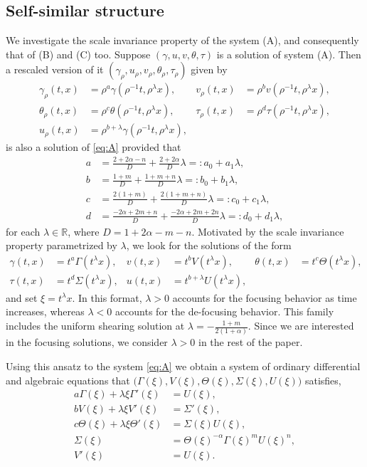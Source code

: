 \documentclass[graybox]{svmult}
\begin{document}
\subsection{Self-similar structure}
We investigate the scale invariance property of the system (A), and consequently that of (B) and (C) too.
Suppose $(\gamma,u,v,\theta,\tau)$ is a solution of system (A). Then a rescaled version of it $(\gamma_\rho,u_\rho,v_\rho,\theta_\rho,\tau_\rho)$ given by
\begin{align*}
 \gamma_\rho(t,x) &= \rho^a\gamma(\rho^{-1}t,\rho^\lambda x), &
 v_\rho(t,x) &= \rho^bv(\rho^{-1}t,\rho^\lambda x),\\
 \theta_\rho(t,x) &= \rho^c\theta(\rho^{-1}t,\rho^\lambda x), &
 \tau_\rho(t,x) &= \rho^d\tau(\rho^{-1}t,\rho^\lambda x),\\
 u_\rho(t,x) &= \rho^{b+\lambda}\gamma(\rho^{-1}t,\rho^\lambda x),
\end{align*}
is also a solution of \eqref{eq:A}  provided that 
\begin{align*}
 a&= \frac{2+2\alpha-n}{D} + \frac{2+2\alpha}{D}\lambda =: a_0 + a_1 \lambda, \\
 b&=\frac{1+m}{D} + \frac{1+m+n}{D}\lambda =: b_0 + b_1\lambda,\\
 c&=\frac{2(1+m)}{D} + \frac{2(1+m+n)}{D}\lambda =: c_0 + c_1\lambda, \\
 d&=\frac{-2\alpha + 2m +n}{D} + \frac{-2\alpha+2m+2n}{D}\lambda =: d_0 + d_1\lambda,
\end{align*}
for each $\lambda \in \mathbb{R}$, where  $D = 1+2\alpha-m-n$. 
Motivated by the scale invariance property parametrized by $\lambda$, we look for the solutions of the form 
\begin{align*}
 \gamma(t,x) &= t^a\Gamma(t^\lambda x), & v(t,x) &= t^b V(t^\lambda x), &\theta(t,x) &= t^c \Theta(t^\lambda x),\\
 \tau(t,x) &= t^d \Sigma(t^\lambda x), & u(t,x) &= t^{b+\lambda} U(t^\lambda x),
\end{align*}
and set $\xi = t^\lambda x$. In this format, $\lambda>0$ accounts for the focusing behavior as time increases,  whereas $\lambda<0$ accounts for the de-focusing behavior. This family includes the uniform shearing solution at $\lambda = -\frac{1+m}{2(1+\alpha)}$. Since we are interested in the focusing solutions, we consider $\lambda>0$ in the rest of the paper.


Using this ansatz to the system \eqref{eq:A} we obtain a  system of ordinary differential and algebraic equations that $\big(\Gamma(\xi), V(\xi), \Theta(\xi), \Sigma(\xi), U(\xi)\big)$ satisfies, 
\begin{equation}
\begin{aligned}
 a \Gamma(\xi) + \lambda \xi \Gamma'(\xi) &= U(\xi),\\
 b V(\xi) + \lambda \xi V'(\xi) &= \Sigma'(\xi),\\
 c \Theta(\xi) + \lambda \xi \Theta'(\xi)&=\Sigma(\xi) U(\xi),\\
 \Sigma(\xi) &= \Theta(\xi)^{-\alpha} \Gamma(\xi)^m U(\xi)^n,\\
 V'(\xi)&=U(\xi).
\end{aligned} \label{eq:ss-odes}
\end{equation}
\end{document}
